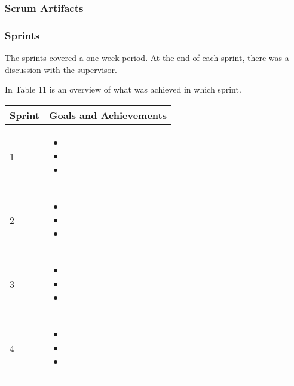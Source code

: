 \documentclass{scrartcl}
\begin{document}
  		\subsubsection{Scrum Artifacts }
  		
  		\subsubsection{Sprints}
  		
	The sprints covered a one week period. At the end of each sprint, there was a discussion with the supervisor.

In Table 11 is an overview of what was achieved in which sprint.

\begin{table}[H]
\begin{center}
\begin{tabular}{| p{2.5cm}| p{12cm} |}
\hline
\rowcolor{LightCyan}
\textbf{Sprint} & \textbf{Goals and Achievements} \\
\hline

1                   &             
\begin{itemize}
\item 
\item
\item



 \end{itemize}\\ \hline
 
2                &             
\begin{itemize}
\item 
\item
\item


 \end{itemize}\\ \hline
 3                 &             
\begin{itemize}
\item 
\item
\item


 \end{itemize}\\ \hline
 4                   &             
\begin{itemize}

\item 
\item
\item
\end{itemize}\\ \hline
 

\end{tabular}
\end{center}
\end{table}
\end{document}
